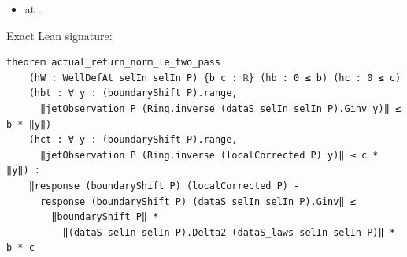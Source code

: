 \begin{theorem}[bp-041]
\begin{itemize}
\item \texttt{} at \texttt{}.
\end{itemize}
\par Exact Lean signature:
\begin{verbatim}
theorem actual_return_norm_le_two_pass
    (hW : WellDefAt selIn selIn P) {b c : ℝ} (hb : 0 ≤ b) (hc : 0 ≤ c)
    (hbt : ∀ y : (boundaryShift P).range,
      ‖jetObservation P (Ring.inverse (dataS selIn selIn P).Ginv y)‖ ≤ b * ‖y‖)
    (hct : ∀ y : (boundaryShift P).range,
      ‖jetObservation P (Ring.inverse (localCorrected P) y)‖ ≤ c * ‖y‖) :
    ‖response (boundaryShift P) (localCorrected P) -
      response (boundaryShift P) (dataS selIn selIn P).Ginv‖ ≤
        ‖boundaryShift P‖ *
          ‖(dataS selIn selIn P).Delta2 (dataS_laws selIn selIn P)‖ * b * c
\end{verbatim}
\end{theorem}

